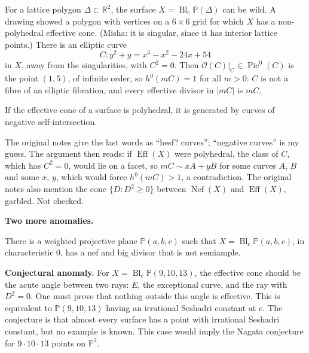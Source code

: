 \begin{remark}
\label{remark-tevelev-wild}
For a lattice polygon $\Delta\subset
\mathbb{R}^2$, the surface
$X=\operatorname{Bl}_e\mathbb{P}(\Delta)$ can
be wild. A drawing showed a polygon with
vertices on a $6\times 6$ grid for which $X$
has a non-polyhedral effective cone. (Misha:
it is singular, since it has interior
lattice points.) There is an elliptic curve
$$
C\colon y^2+y=x^3-x^2-24x+54
$$
in $X$, away from the singularities, with
$C^2=0$. Then
$\mathcal{O}(C)|_C\in\operatorname{Pic}^0(C)$
is the point $(1,5)$, of infinite order, so
$h^0(mC)=1$ for all $m>0$: $C$ is not a
fibre of an elliptic fibration, and every
effective divisor in $|mC|$ is $mC$.
\end{remark}

\begin{theorem}[Nikulin]
\label{theorem-tevelev-nikulin}
If the effective cone of a surface is
polyhedral, it is generated by curves of
negative self-intersection.
\end{theorem}

The original notes give the last words as
``hesf? curves''; ``negative curves'' is my
guess. The argument then reads: if
$\operatorname{Eff}(X)$ were polyhedral,
the class of $C$, which has $C^2=0$, would
lie on a facet, so
$mC\sim xA+yB$ for some curves $A$, $B$
and some $x$, $y$, which would force
$h^0(mC)>1$, a contradiction. The original
notes also mention the cone
$\{D : D^2\geq 0\}$ between
$\operatorname{Nef}(X)$ and
$\operatorname{Eff}(X)$, garbled. Not
checked.

\medskip\noindent
{\bf Two more anomalies.}

\begin{theorem}
\label{theorem-tevelev-gnw}
There is a weighted projective plane
$\mathbb{P}(a,b,c)$ such that
$X=\operatorname{Bl}_e\mathbb{P}(a,b,c)$, in
characteristic $0$, has a nef and big
divisor that is not semiample.
\end{theorem}

\medskip\noindent
{\bf Conjectural anomaly.} For
$X=\operatorname{Bl}_e\mathbb{P}(9,10,13)$,
the effective cone should be the acute angle
between two rays: $E$, the exceptional
curve, and the ray with $D^2=0$. One must
prove that nothing outside this angle is
effective. This is equivalent to
$\mathbb{P}(9,10,13)$ having an irrational
Seshadri constant at $e$. The conjecture is
that almost every surface has a point with
irrational Seshadri constant, but no example
is known. This case would imply the Nagata
conjecture for $9\cdot 10\cdot 13$ points
on $\mathbb{P}^2$.

